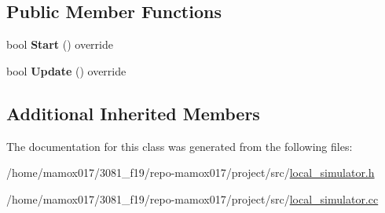 \subsection*{Public Member Functions}
\begin{DoxyCompactItemize}
\item 
\mbox{\label{classLocalSimulator_a380634942668855dd1da8276b270b362}} 
bool {\bfseries Start} () override
\item 
\mbox{\label{classLocalSimulator_ac98ba1a401ad204dd5169934adb02684}} 
bool {\bfseries Update} () override
\end{DoxyCompactItemize}
\subsection*{Additional Inherited Members}


The documentation for this class was generated from the following files\+:\begin{DoxyCompactItemize}
\item 
/home/mamox017/3081\+\_\+f19/repo-\/mamox017/project/src/\hyperlink{local__simulator_8h}{local\+\_\+simulator.\+h}\item 
/home/mamox017/3081\+\_\+f19/repo-\/mamox017/project/src/\hyperlink{local__simulator_8cc}{local\+\_\+simulator.\+cc}\end{DoxyCompactItemize}
